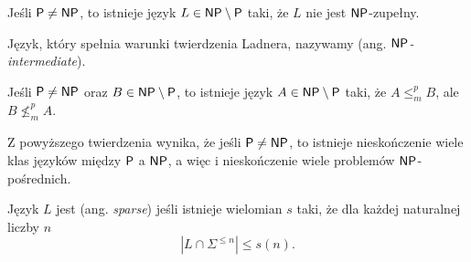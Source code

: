 \begin{theorem}[Ladnera]
    Jeśli $\textsf{P} \neq \textsf{NP}$, to istnieje język $L \in \textsf{NP} \setminus \textsf{P}$ taki, że $L$ nie jest $\textsf{NP}$-zupełny.
\end{theorem}

Język, który spełnia warunki twierdzenia Ladnera, nazywamy  (ang. \textit{$\textsf{NP}$-intermediate}).

\begin{theorem}
    Jeśli $\textsf{P} \neq \textsf{NP}$ oraz $B \in \textsf{NP} \setminus \textsf{P}$, to istnieje język $A \in \textsf{NP} \setminus \textsf{P}$ taki, że $A \leq_m^p B$, ale $B \nleq_m^p A$.
\end{theorem}

Z powyższego twierdzenia wynika, że jeśli $\textsf{P} \neq \textsf{NP}$, to istnieje nieskończenie wiele klas języków między $\textsf{P}$ a $\textsf{NP}$, a więc i nieskończenie wiele problemów $\textsf{NP}$-pośrednich.

\begin{definition}\label{d:sparse}
    Język $L$ jest  (ang. \textit{sparse}) jeśli istnieje wielomian $s$ taki, że dla każdej naturalnej liczby $n$
    \[ \left|L \cap \Sigma^{\leq n}\right| \leq s(n). \]
\end{definition}

